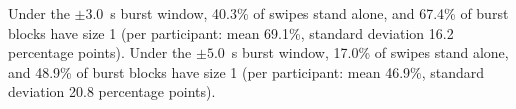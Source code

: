 Under the \(\pm3.0\)~s burst window, 40.3\% of swipes stand alone, and 67.4\% of burst blocks have size 1 (per participant: mean 69.1\%, standard deviation 16.2 percentage points). Under the \(\pm5.0\)~s burst window, 17.0\% of swipes stand alone, and 48.9\% of burst blocks have size 1 (per participant: mean 46.9\%, standard deviation 20.8 percentage points). 
